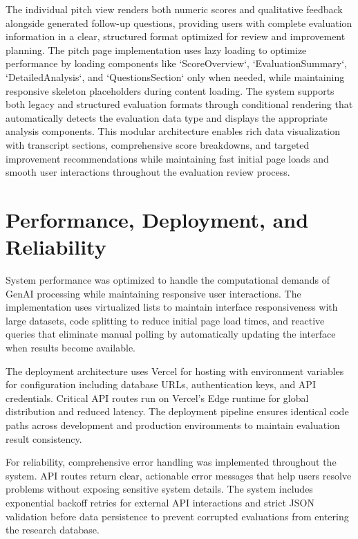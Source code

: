 The individual pitch view renders both numeric scores and qualitative feedback alongside generated follow-up questions, providing users with complete evaluation information in a clear, structured format optimized for review and improvement planning. The pitch page implementation uses lazy loading to optimize performance by loading components like `ScoreOverview`, `EvaluationSummary`, `DetailedAnalysis`, and `QuestionsSection` only when needed, while maintaining responsive skeleton placeholders during content loading. The system supports both legacy and structured evaluation formats through conditional rendering that automatically detects the evaluation data type and displays the appropriate analysis components. This modular architecture enables rich data visualization with transcript sections, comprehensive score breakdowns, and targeted improvement recommendations while maintaining fast initial page loads and smooth user interactions throughout the evaluation review process.

\section{Performance, Deployment, and Reliability}

System performance was optimized to handle the computational demands of GenAI processing while maintaining responsive user interactions. The implementation uses virtualized lists to maintain interface responsiveness with large datasets, code splitting to reduce initial page load times, and reactive queries that eliminate manual polling by automatically updating the interface when results become available.

The deployment architecture uses Vercel for hosting with environment variables for configuration including database URLs, authentication keys, and API credentials. Critical API routes run on Vercel's Edge runtime for global distribution and reduced latency. The deployment pipeline ensures identical code paths across development and production environments to maintain evaluation result consistency.

For reliability, comprehensive error handling was implemented throughout the system. API routes return clear, actionable error messages that help users resolve problems without exposing sensitive system details. The system includes exponential backoff retries for external API interactions and strict JSON validation before data persistence to prevent corrupted evaluations from entering the research database.

